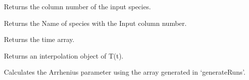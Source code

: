 \documentclass[letterpaper,10pt,english]{sphinxmanual}
\begin{document}
\begin{fulllineitems}
\begin{fulllineitems}
\end{fulllineitems}


\begin{fulllineitems}
\label{Appendix:CPD_Fit_lin_regr.ProcessCPD.SpeciesIndex}
Returns the column number of the input species.

\end{fulllineitems}


\begin{fulllineitems}
\label{Appendix:CPD_Fit_lin_regr.ProcessCPD.SpeciesName}
Returns the Name of species with the Input column number.

\end{fulllineitems}


\begin{fulllineitems}
\label{Appendix:CPD_Fit_lin_regr.ProcessCPD.Time}
Returns the time array.

\end{fulllineitems}


\begin{fulllineitems}
\label{Appendix:CPD_Fit_lin_regr.ProcessCPD.TtInterpol}
Returns an interpolation object of T(t).

\end{fulllineitems}


\begin{fulllineitems}
\label{Appendix:CPD_Fit_lin_regr.ProcessCPD.calcAE}
Calculates the Arrhenius parameter using the array generated in `generateRuns'.

\end{fulllineitems}



\end{fulllineitems}
\end{document}
